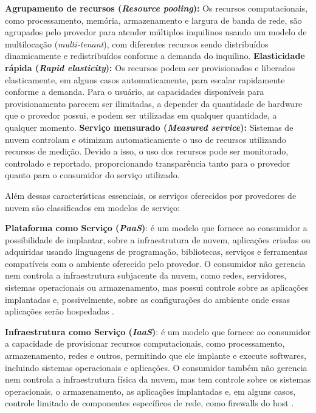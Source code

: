 \textbf{Agrupamento de recursos (\textit{Resource pooling}):} Os recursos computacionais, como processamento, memória, armazenamento e largura de banda de rede, são agrupados pelo provedor para atender múltiplos inquilinos usando um modelo de multilocação (\textit{multi-tenant}), com diferentes recursos sendo distribuídos dinamicamente e redistribuídos conforme a demanda do inquilino.
\textbf{Elasticidade rápida (\textit{Rapid elasticity}):} Os recursos podem ser provisionados e liberados elasticamente, em alguns casos automaticamente, para escalar rapidamente conforme a demanda. Para o usuário, as capacidades disponíveis para provisionamento parecem ser ilimitadas, a depender da quantidade de hardware que o provedor possui,  e podem ser utilizadas em qualquer quantidade, a qualquer momento. 
\textbf{Serviço mensurado (\textit{Measured service}):} Sistemas de nuvem controlam e otimizam automaticamente o uso de recursos utilizando recursos de medição. Devido a isso, o uso dos recursos pode ser monitorado, controlado e reportado, proporcionando transparência tanto para o provedor quanto para o consumidor do serviço utilizado. 

Além dessas características essenciais, os serviços oferecidos por provedores de nuvem são classificados em modelos de serviço:

\textbf{Plataforma como Serviço (\textit{PaaS})}: é um modelo que fornece ao consumidor a possibilidade de implantar, sobre a infraestrutura de nuvem, aplicações criadas ou adquiridas usando linguagens de programação, bibliotecas, serviços e ferramentas compatíveis com o ambiente oferecido pelo provedor. O consumidor não gerencia nem controla a infraestrutura subjacente da nuvem, como redes, servidores, sistemas operacionais ou armazenamento, mas possui controle sobre as aplicações implantadas e, possivelmente, sobre as configurações do ambiente onde essas aplicações serão hospedadas \cite{mell2011}.

\textbf{Infraestrutura como Serviço (\textit{IaaS})}: é um modelo que fornece ao consumidor a capacidade de provisionar recursos computacionais, como processamento, armazenamento, redes e outros, permitindo que ele implante e execute softwares, incluindo sistemas operacionais e aplicações. O consumidor também não gerencia nem controla a infraestrutura física da nuvem, mas tem controle sobre os sistemas operacionais, o armazenamento, as aplicações implantadas e, em alguns casos, controle limitado de componentes específicos de rede, como firewalls do host \cite{mell2011}.








